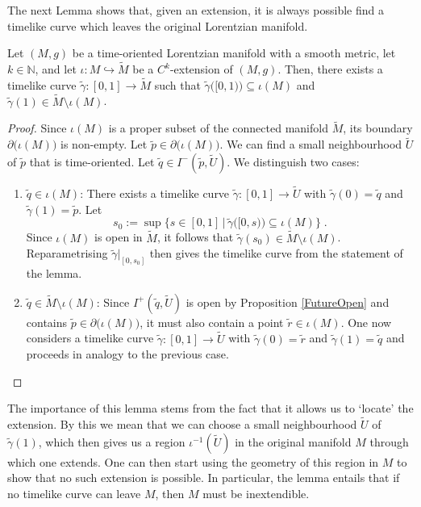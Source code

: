 \documentclass[reqno]{article}
\newcommand{\N}{\mathbb{N}}
\begin{document}
The next Lemma shows that, given an extension, it is always possible find a timelike curve which leaves the original Lorentzian manifold.

\begin{lemma}
\label{ExtensionLemma}
Let $(M,g)$ be a time-oriented Lorentzian manifold with a smooth metric, let $k \in \N$, and let $\iota : M \hookrightarrow \tilde{M}$ be a $C^k$-extension of $(M,g)$. Then, there exists a timelike curve $\tilde{\gamma} : [0,1] \to \tilde{M}$ such that $\tilde{\gamma}\big([0,1)\big) \subseteq \iota(M)$ and $\tilde{\gamma}(1) \in \tilde{M}\setminus \iota(M)$.
\end{lemma}

\begin{proof}
Since $\iota(M)$ is a proper subset of the connected manifold $\tilde{M}$, its boundary $\partial\big(\iota(M)\big)$ is non-empty. Let $\tilde{p} \in \partial\big(\iota(M)\big)$. We can find a small neighbourhood $\tilde{U}$ of $\tilde{p}$ that is time-oriented. Let $\tilde{q} \in I^-(\tilde{p}, \tilde{U})$. We distinguish two cases:
\begin{enumerate}
\item  $\tilde{q} \in \iota(M)$: There exists a timelike curve $\tilde{\gamma} : [0,1] \to \tilde{U}$ with $\tilde{\gamma}(0) = \tilde{q}$ and $\tilde{\gamma}(1) = \tilde{p}$. Let
\begin{equation*}
s_0 := \sup \{ s \in [0,1] \, | \, \tilde{\gamma}\big([0,s)\big) \subseteq \iota(M) \} \;.
\end{equation*}
Since $\iota(M)$ is open in $\tilde{M}$, it follows that $\tilde{\gamma}(s_0) \in \tilde{M} \setminus \iota(M)$. Reparametrising $\tilde{\gamma}|_{[0,s_0]}$ then gives the timelike curve from the statement of the lemma.
\item $\tilde{q} \in \tilde{M}\setminus \iota(M)$: Since $I^+(\tilde{q},\tilde{U})$ is open by Proposition \ref{FutureOpen} and contains $\tilde{p} \in \partial\big(\iota(M)\big)$, it must also contain a point $\tilde{r} \in \iota(M)$. One now considers a timelike curve $\tilde{\gamma} : [0,1] \to \tilde{U}$ with $\tilde{\gamma}(0) = \tilde{r}$ and $\tilde{\gamma}(1) = \tilde{q}$ and proceeds in analogy to the previous case.
\end{enumerate}
\end{proof}

The importance of this lemma stems from the fact that it allows us to `locate' the extension. By this we mean that we can choose a small neighbourhood $\tilde{U}$ of $\tilde{\gamma}(1)$, which then gives us a region $\iota^{-1}(\tilde{U}) $ in the original manifold $M$ through which one extends.  One can then start using the geometry of this region in $M$ to show that no such extension is possible. In particular, the lemma entails that if no timelike curve can leave $M$, then $M$ must be inextendible.
\end{document}
